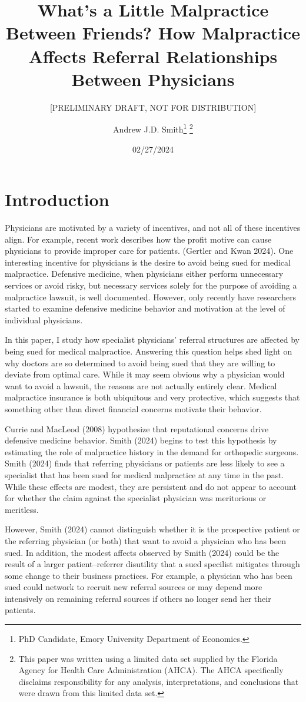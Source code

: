 \documentclass[
  12pt,
]{article}
\title{What's a Little Malpractice Between Friends? How Malpractice Affects Referral Relationships Between Physicians}
\subtitle{{[}PRELIMINARY DRAFT, NOT FOR DISTRIBUTION{]}}
\author{Andrew J.D. Smith\footnote{PhD Candidate, Emory University Department of Economics.} \footnote{This paper was written using a limited data set supplied by the Florida Agency for Health Care Administration (AHCA). The AHCA specifically disclaims responsibility for any analysis, interpretations, and conclusions that were drawn from this limited data set.}}
\date{02/27/2024}
\begin{document}
\maketitle

\hypertarget{introduction}{%
\section{Introduction}\label{introduction}}

Physicians are motivated by a variety of incentives, and not all of these incentives align. For example, recent work describes how the profit motive can cause physicians to provide improper care for patients. (Gertler and Kwan 2024). One interesting incentive for physicians is the desire to avoid being sued for medical malpractice. Defensive medicine, when physicians either perform unnecessary services or avoid risky, but necessary services solely for the purpose of avoiding a malpractice lawsuit, is well documented. However, only recently have researchers started to examine defensive medicine behavior and motivation at the level of individual physicians.

In this paper, I study how specialist physicians' referral structures are affected by being sued for medical malpractice. Answering this question helps shed light on why doctors are so determined to avoid being sued that they are willing to deviate from optimal care. While it may seem obvious why a physician would want to avoid a lawsuit, the reasons are not actually entirely clear. Medical malpractice insurance is both ubiquitous and very protective, which suggests that something other than direct financial concerns motivate their behavior.

Currie and MacLeod (2008) hypothesize that reputational concerns drive defensive medicine behavior. Smith (2024) begins to test this hypothesis by estimating the role of malpractice history in the demand for orthopedic surgeons. Smith (2024) finds that referring physicians or patients are less likely to see a specialist that has been sued for medical malpractice at any time in the past. While these effects are modest, they are persistent and do not appear to account for whether the claim against the specialist physician was meritorious or meritless.

However, Smith (2024) cannot distinguish whether it is the prospective patient or the referring physician (or both) that want to avoid a physician who has been sued. In addition, the modest affects observed by Smith (2024) could be the result of a larger patient--referrer disutility that a sued specilist mitigates through some change to their business practices. For example, a physician who has been sued could network to recruit new referral sources or may depend more intensively on remaining referral sources if others no longer send her their patients.
\end{document}
